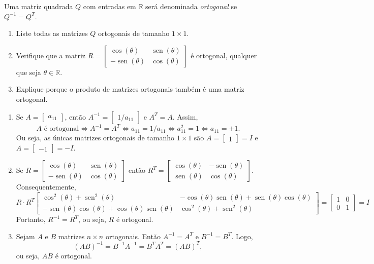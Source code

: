 \documentclass[12pt,a4paper]{article}
\newcommand*\sen{\operatorname{sen}}
\newcommand*\R{\mathbb{R}}
\begin{document}
\begin{ExerciseList}
\Exercise[title={1,8}] Uma matriz quadrada $Q$ com entradas em $\R$ será denominada \emph{ortogonal} se $Q^{-1} = Q^T$.
\begin{enumerate}
\item Liste todas as matrizes $Q$ ortogonais de tamanho $1 \times 1$.
\item Verifique que a matriz $R =\begin{bmatrix}
\cos(\theta)& \sen(\theta) \\
-\sen(\theta) & \cos(\theta)
\end{bmatrix}$ é ortogonal, qualquer que seja $\theta \in \R$.
\item Explique porque o produto de matrizes ortogonais também é uma matriz ortogonal.
\end{enumerate}

\Answer
\begin{enumerate}
\item Se $A=\begin{bmatrix}a_{11}\end{bmatrix}$, então $A^{-1} = \begin{bmatrix}1/a_{11}\end{bmatrix}$ e $A^T = A$. Assim,
\[
A \text{ é ortogonal}
\Leftrightarrow A^{-1} = A^T
\Leftrightarrow a_{11} = 1/a_{11}
\Leftrightarrow a_{11}^2 = 1
\Leftrightarrow a_{11} = \pm 1.
\]
Ou seja, as únicas matrizes ortogonais de tamanho $1 \times 1$ são $A=\begin{bmatrix}1\end{bmatrix} = I$ e $A=\begin{bmatrix}-1\end{bmatrix} = -I$.
\item Se $R =\begin{bmatrix}
\cos(\theta)& \sen(\theta) \\
-\sen(\theta) & \cos(\theta)
\end{bmatrix}$
então $R^T =\begin{bmatrix}
\cos(\theta)& -\sen(\theta) \\
\sen(\theta) & \cos(\theta)
\end{bmatrix}$.
Consequentemente,
\[
R \cdot R^T
\begin{bmatrix}
\cos^2(\theta) + \sen^2(\theta) & -\cos(\theta)\sen(\theta) + \sen(\theta)\cos(\theta) \\
- \sen(\theta)\cos(\theta) + \cos(\theta)\sen(\theta) & \cos^2(\theta) + \sen^2(\theta)
\end{bmatrix}
=
\begin{bmatrix}
1 & 0 \\
0 & 1
\end{bmatrix}
= I
\]
Portanto, $R^{-1} = R^T$, ou seja, $R$ é ortogonal.
\item Sejam $A$ e $B$ matrizes $n \times n$ ortogonais. Então $A^{-1} = A^T$ e $B^{-1} = B^T$. Logo,
\[
(AB)^{-1} = B^{-1} A^{-1} = B^T A^T = (AB)^T,
\]
ou seja, $AB$ é ortogonal.

\end{enumerate}
\end{ExerciseList}
\end{document}
